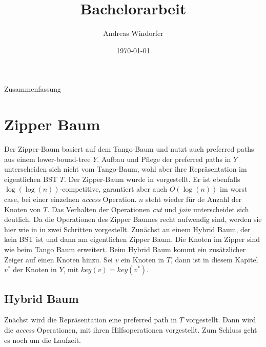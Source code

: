 \documentclass[a4paper,12pt]{article}
\title{Bachelorarbeit}
\author{
Andreas Windorfer\\
}
\date{\today}
\begin{document}
\maketitle
\newpage
Zusammenfassung
\newpage
\tableofcontents


\newpage


\section {Zipper Baum}
Der Zipper-Baum basiert auf dem Tango-Baum und nutzt auch preferred paths aus einem lower-bound-tree $Y$. Aufbau und Pflege der preferred paths in $Y$ unterscheiden sich nicht vom Tango-Baum, wohl aber ihre Repräsentation im eigentlichen BST $T$. Der Zipper-Baum wurde in \cite{zipper} vorgestellt. Er ist ebenfalls $\log\left(\log\left(n\right)\right)$-competitive,  garantiert aber auch  $O\left(\log \left(n\right)\right)$ im worst case, bei einer einzelnen \textit{access} Operation. $n$ steht wieder für de Anzahl der Knoten von $T$. Das Verhalten der Operationen \textit{cut} und \textit{join} unterscheidet sich deutlich. Da die Operationen des Zipper Baumes recht aufwendig sind, werden sie hier wie in \cite{zipper} in zwei Schritten vorgestellt. Zunächst an einem Hybrid Baum, der kein  BST ist und dann am eigentlichen Zipper Baum. Die Knoten im Zipper sind wie beim Tango Baum erweitert. Beim Hybrid Baum kommt ein zusätzlicher Zeiger auf einen Knoten hinzu.  Sei $v$ ein Knoten in $T$, dann ist in diesem Kapitel $v^*$ der Knoten in $Y$, mit $\mathit{key}\left(v\right) = \mathit{key}\left(v^*\right)$.

\subsection{Hybrid Baum}
Znächst wird die Repräsentation eine preferred path in $T$ vorgestellt. Dann wird die \textit{access} Operationen, mit ihren Hilfsoperationen vorgestellt. Zum Schluss geht es noch um die Laufzeit. 
\end{document}
